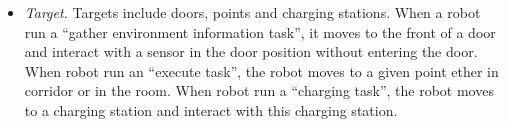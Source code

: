 \begin{table}[htb]
\centering
{}
\caption{Task Table in Database}
\label{tab:task_table}
\end{table}

\begin{itemize}
	\item \textsl{Target.} Targets include doors, points and charging stations. When a robot run a ``gather environment information task'', it moves to the front of a door and interact with a sensor in the door position without entering the door. 
	When robot run an ``execute task'', the robot moves to a given point ether in corridor or in the room.
	When robot run a ``charging task'', the robot moves to a charging station and interact with this charging station.
\end{itemize}

